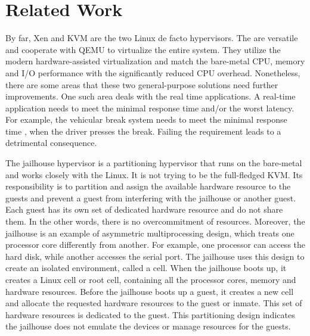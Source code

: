 \section{Related Work}
%
%
%
%
%

By far, Xen and KVM are the two Linux de facto hypervisors.
The are versatile and cooperate with QEMU to virtualize the
entire system. They utilize the modern hardware-assisted
virtualization and match the bare-metal CPU, memory and I/O
performance with the significantly reduced CPU overhead.
Nonetheless, there are some areas that these two
general-purpose solutions need further improvements. One such
area deals with the real time applications. A real-time
application needs to meet the minimal response time and/or the
worst latency. For example, the vehicular break system needs
to meet the minimal response time , when the driver presses
the break. Failing the requirement leads to a detrimental
consequence.

The jailhouse hypervisor is a partitioning hypervisor that
runs on the bare-metal and works closely with the
Linux\cite{sinitsyn:2015, ramsauer:2017}. It is not trying to
be the full-fledged KVM. Its responsibility is to partition
and assign the available hardware resource to the guests and
prevent a guest from interfering with the jailhouse or another
guest. Each guest has its own set of dedicated hardware
resource and do not share them. In the other words, there is
no overcommitment of resources. Moreover, the jailhouse is an
example of asymmetric multiprocessing design, which treats one
processor core differently from another. For example, one
processor can access the hard disk, while another accesses the
serial port. The jailhouse uses this design to create an
isolated environment, called a cell. When the jailhouse boots
up, it creates a Linux cell or root cell, containing all the
processor cores, memory and hardware resources. Before the
jailhouse boots up a guest, it creates a new cell and allocate
the requested hardware resources to the guest or inmate. This
set of hardware resources is dedicated to the guest. This
partitioning design indicates the jailhouse does not emulate
the devices or manage resources for the guests.


